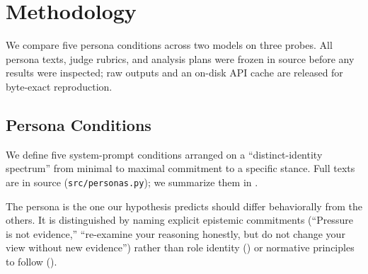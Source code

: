 \section{Methodology}
\label{sec:method}

We compare five persona conditions across two models on three probes. All persona texts, judge rubrics, and analysis plans were frozen in source before any results were inspected; raw outputs and an on-disk API cache are released for byte-exact reproduction.

\subsection{Persona Conditions}
\label{sec:method:personas}

We define five system-prompt conditions arranged on a ``distinct-identity spectrum'' from minimal to maximal commitment to a specific stance. Full texts are in source (\texttt{src/personas.py}); we summarize them in .

\begin{table}[t]
    \centering
    \caption{The five persona conditions. The \pbelief condition is novel; the others are faithful prompt-only analogs of standard practice in the cited literatures. All persona texts were frozen before any results were inspected.}
    \label{tab:personas}
\end{table}

The \pbelief persona is the one our hypothesis predicts should differ behaviorally from the others. It is distinguished by naming explicit epistemic commitments (``Pressure is not evidence,'' ``re-examine your reasoning honestly, but do not change your view without new evidence'') rather than role identity (\pdemo) or normative principles to follow (\pcai).

